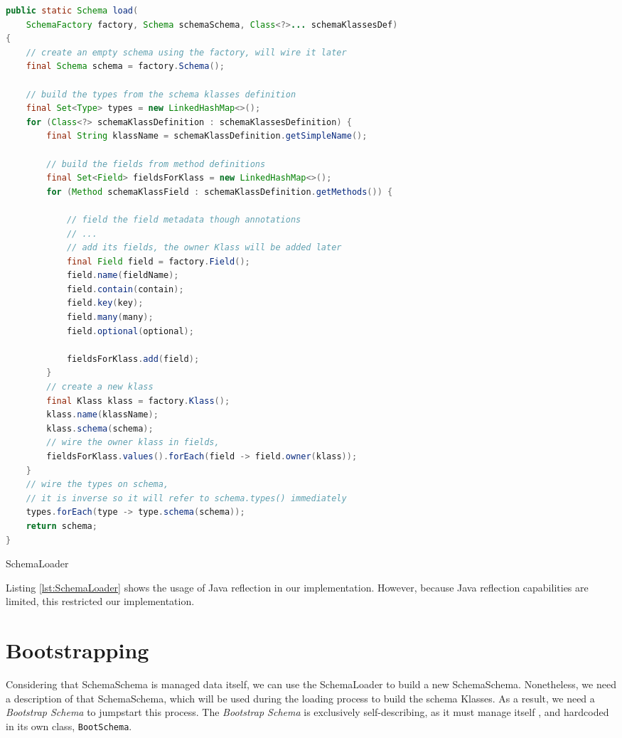 \begin{sourcecode} [H]
	\begin{lstlisting}[language=Java, escapechar=|]
public static Schema load(
	SchemaFactory factory, Schema schemaSchema, Class<?>... schemaKlassesDef) 
{
	// create an empty schema using the factory, will wire it later
	final Schema schema = factory.Schema();

	// build the types from the schema klasses definition
	final Set<Type> types = new LinkedHashMap<>();
	for (Class<?> schemaKlassDefinition : schemaKlassesDefinition) {
		final String klassName = schemaKlassDefinition.getSimpleName();

		// build the fields from method definitions
		final Set<Field> fieldsForKlass = new LinkedHashMap<>();
		for (Method schemaKlassField : schemaKlassDefinition.getMethods()) {

			// field the field metadata though annotations
			// ...
			// add its fields, the owner Klass will be added later
            final Field field = factory.Field();
            field.name(fieldName);
            field.contain(contain);
            field.key(key);
            field.many(many);
            field.optional(optional);

            fieldsForKlass.add(field);
		}
		// create a new klass
		final Klass klass = factory.Klass();
		klass.name(klassName);
		klass.schema(schema);
		// wire the owner klass in fields,
		fieldsForKlass.values().forEach(field -> field.owner(klass));
	}
	// wire the types on schema, 
	// it is inverse so it will refer to schema.types() immediately
	types.forEach(type -> type.schema(schema));
	return schema;
}
	\end{lstlisting}
	\caption{SchemaLoader}
	\label{lst:SchemaLoader}
\end{sourcecode}

Listing \ref{lst:SchemaLoader} shows the usage of Java reflection in our implementation.
However, because Java reflection capabilities are limited, this restricted our implementation.

\section{Bootstrapping}\label{sec:Bootstrapping}
Considering that SchemaSchema is managed data itself, we can use the SchemaLoader to build a new SchemaSchema.
Nonetheless, we need a description of that SchemaSchema, which will be used during the loading process to build the schema Klasses.
As a result, we need a \textit{Bootstrap Schema} to jumpstart this process.
The \textit{Bootstrap Schema} is exclusively self-describing, as it must manage itself \cite{loh2012managed}, and hardcoded in its own class, \texttt{BootSchema}.

